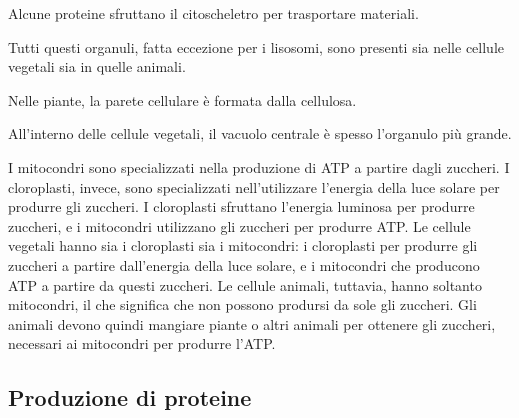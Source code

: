 \documentclass[a4paper]{article}
\begin{document}
Alcune proteine sfruttano il citoscheletro per trasportare materiali.

Tutti questi organuli, fatta eccezione per i lisosomi, sono presenti
sia nelle cellule vegetali sia in quelle animali.

Nelle piante, la parete cellulare è formata dalla cellulosa.

All'interno delle cellule vegetali, il vacuolo centrale è spesso l'organulo più grande.

I mitocondri sono specializzati nella
produzione di ATP a partire dagli zuccheri. I cloroplasti, invece, sono specializzati
nell'utilizzare l'energia della luce solare per produrre gli zuccheri.
I cloroplasti sfruttano l'energia luminosa per produrre zuccheri, e i mitocondri
utilizzano gli zuccheri per produrre ATP. Le cellule vegetali hanno sia i cloroplasti sia i
mitocondri: i cloroplasti per produrre gli zuccheri a partire dall'energia della luce solare, e i
mitocondri che producono ATP a partire da questi zuccheri. Le cellule animali, tuttavia,
hanno soltanto mitocondri, il che significa che non possono prodursi da sole gli zuccheri. Gli
animali devono quindi mangiare piante o altri animali per ottenere gli zuccheri, necessari ai
mitocondri per produrre l'ATP.



\pagebreak

\subsection{Produzione di proteine}

\end{document}
